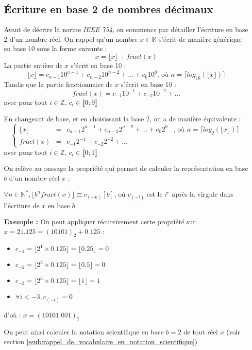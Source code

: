 \documentclass[../../main.tex]{subfiles}
\begin{document}
\subsection{Écriture en base 2 de nombres décimaux} \label{sub:_criture_en_base_2_de_nombres_d_cimaux}
Avant de décrire la norme \textit{IEEE 754}, on commence par détailler l'écriture en base 2 d'un nombre réel. 
On rappel qu'un nombre $x\in{\mathbb{R}}$ s'écrit de manière générique en base 10 sous la forme suivante :
$$x = \lfloor{x}\rfloor + fract(x)$$
La partie entière de $x$ s'écrit en base 10 : 
$$\lfloor{x}\rfloor = c_{n-1}10^{n-1} + c_{n-2}10^{n-2} + \dots + c_{0}10^{0}\text{, où $n = \lceil log_{10}(\lfloor{x}\rfloor)\rceil$}$$
Tandis que la partie fractionnaire de $x$ s'écrit en base 10 :
$$fract(x) = c_{-1}10^{-1} + c_{-2}10^{-2} + \dots$$
avec pour tout $i\in\mathbb{Z}$, $c_{i}\in{\llbracket{0; 9\rrbracket}}$

En changeant de base, et en choisissant la base 2, on a de manière équivalente :
$$\left\{\begin{array}{lcll}
\lfloor{x}\rfloor & = & c_{n-1}2^{n-1} + c_{n-2}2^{n-2} + \dots + c_{0}2^{0} & \text{, où $n = \lceil log_{2}(\lfloor{x}\rfloor)\rceil$} \\
fract(x) & = & c_{-1}2^{-1} + c_{-2}2^{-2} + \dots
\end{array}\right.$$
avec pour tout $i\in\mathbb{Z}$, $c_{i}\in{\llbracket{0; 1\rrbracket}}$

On relève au passage la propriété qui permet de calculer la représentation en base $b$ d'un nombre réel $x$ :

\proposition{} $\forall{n\in{\mathbb{N}^{*}}}, \lfloor b^{n}fract(x)\rfloor \equiv c_{(-n)}[b]$, où $c_{(-i)}$ est le $i^e$ après la virgule dans l'écriture de $x$ en base $b$.

\textbf{Exemple :} On peut appliquer récursivement cette propriété sur $x = 21.125 = (10101)_{2} + 0.125$ :
\begin{itemize}
     \item $c_{-1} = \lfloor 2^{1}\times{0.125} \rfloor = \lfloor 0.25\rfloor = 0$
     \item $c_{-2} = \lfloor 2^{2}\times{0.125} \rfloor = \lfloor 0.5\rfloor = 0$
     \item $c_{-3} = \lfloor 2^{3}\times{0.125} \rfloor = \lfloor 1\rfloor = 1$
     \item $\forall{i < -3}, c_{(-i)} = 0$
\end{itemize}
d'où : $x = (10101.001)_{2}$

On peut ainsi calculer la notation scientifique en base $b = 2$ de tout réel $x$ (voir section \ref{ssub:rappel_de_vocabulaire_en_notation_scientifique})
\end{document}
